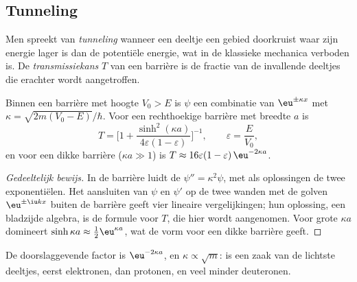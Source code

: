 \subsection*{Tunneling}

\begin{definition}\label{def:b3:quantum-model-systems:tunnelling}
Men spreekt van \emph{tunneling} wanneer een deeltje een
gebied doorkruist waar zijn energie lager is dan de potentiële energie,
wat in de klassieke mechanica verboden is. De
\emph{transmissiekans}
$T$ van een barrière is de fractie van de invallende deeltjes die erachter
wordt aangetroffen.
\end{definition}

\begin{proposition}\label{prop:b3:quantum-model-systems:barrier}
Binnen een barrière met hoogte $V_0 > E$ is $\psi$ een combinatie van
$\eu^{\pm\kappa x}$ met $\kappa = \sqrt{2m(V_0 - E)}/\hbar$. Voor een
rechthoekige barrière met breedte $a$ is
\[
T = \Big[1 + \frac{\sinh^2(\kappa a)}{4\varepsilon(1-\varepsilon)}\Big]^{-1},
\qquad \varepsilon = \frac{E}{V_0},
\]
en voor een dikke barrière ($\kappa a \gg 1$) is $T \approx 16\varepsilon(1-\varepsilon)
\,\eu^{-2\kappa a}$.
\end{proposition}

\begin{proof}[Gedeeltelijk bewijs]
In de barrière luidt de  $\psi'' = \kappa^2\psi$, met
als oplossingen de twee exponentiëlen. Het aansluiten van $\psi$ en
$\psi'$ op de twee wanden met de golven $\eu^{\pm\iu kx}$ buiten de
barrière geeft vier lineaire vergelijkingen; hun
oplossing, een bladzijde algebra, is de formule voor $T$, die hier wordt
aangenomen. Voor grote $\kappa a$ domineert $\sinh\kappa a \approx \frac12\eu^{\kappa a}$, wat
de vorm voor een dikke barrière geeft.
\end{proof}

De doorslaggevende factor is $\eu^{-2\kappa a}$, en $\kappa \propto \sqrt m$:
 is een zaak van de lichtste deeltjes, eerst elektronen, dan
protonen, en veel minder deuteronen.

